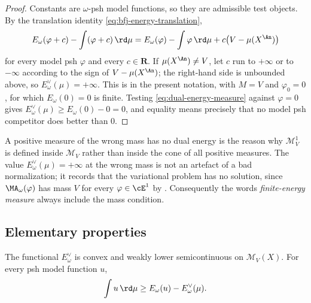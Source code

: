 \begin{proof}
Constants are \(\omega\)-psh model functions, so they are admissible test
objects.  By the translation identity \eqref{eq:bfj-energy-translation},
\begin{equation}
\label{eq:dual-energy-constant-test}
 E_\omega(\varphi+c)-\int(\varphi+c)\,\rd \mu
 =E_\omega(\varphi)-\int\varphi\,\rd \mu
   +c\bigl(V-\mu(X^{\An})\bigr)
\end{equation}
for every model psh \(\varphi\) and every \(c\in\mathbf R\).  If
\(\mu(X^{\An})\neq V\), let \(c\) run to \(+\infty\) or to \(-\infty\)
according to the sign of \(V-\mu(X^{\An})\); the right-hand side is
unbounded above, so \(E^\vee_\omega(\mu)=+\infty\).  This is
 in the present notation, with \(M=V\) and
\(\varphi_0=0\), for which \(E_\omega(0)=0\) is finite.  Testing
\eqref{eq:dual-energy-measure} against \(\varphi=0\) gives
\(E^\vee_\omega(\mu)\geq E_\omega(0)-0=0\), and equality means precisely that
no model psh competitor does better than \(0\).
\end{proof}

\begin{warning}{A positive measure of the wrong mass has no dual energy}
 is the reason why \(\mathcal M^1_V\) is defined
inside \(\mathcal M_V\) rather than inside the cone of all positive
measures.  The value \(E^\vee_\omega(\mu)=+\infty\) at the wrong mass is not
an artefact of a bad normalization; it records that the variational problem
has no solution, since \(\MA_\omega(\varphi)\) has mass \(V\) for every
\(\varphi\in\cE^1\) by .  Consequently the
words \emph{finite-energy measure} always include the mass condition.
\end{warning}

\subsection{Elementary properties}
\label{sec:ch28-dual-elementary}

\begin{proposition}
\label{prop:dual-energy-elementary}
The functional \(E_\omega^\vee\) is convex and weakly lower
semicontinuous on \(\mathcal M_V(X)\).  For every psh model function \(u\),
\begin{equation}
\label{eq:measure-fenchel-energy}
       \int u\,\rd \mu
       \geq E_\omega(u)-E_\omega^\vee(\mu).
\end{equation}
\end{proposition}


